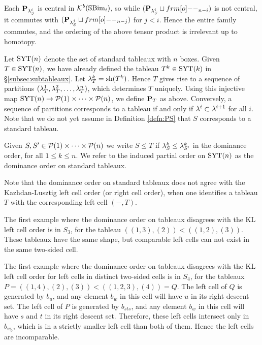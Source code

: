 Each ${\mathbf P}_{\lambda_S^i}$ is central in ${\mathcal{K}}^b({\mathbb{S}}{\rm Bim }_i)$, so while $(\PB_{\l_S^i}\sqcup \one_{n-i})$ is not central, it commutes with $(\PB_{\l_S^j}\sqcup \one_{n-j})$ for $j<i$. Hence the entire family commutes, and the ordering of the above tensor product is irrelevant up to homotopy.

Let $\operatorname{SYT}(n)$ denote the set of standard tableaux with $n$ boxes. Given $T \in \operatorname{SYT}(n)$, we have already defined the tableau $T^k \in \operatorname{SYT}(k)$ in
\S\ref{subsec:subtableaux}. Let $\lambda_T^k = \operatorname{sh}(T^k)$. Hence $T$ gives rise to a sequence of partitions $(\lambda_T^1, \lambda_T^2, \ldots, \lambda_T^n)$, which determines $T$ uniquely. Using this
injective map $\operatorname{SYT}(n) \rightarrow {\mathcal{P}}(1) \times \cdots \times {\mathcal{P}}(n)$, we define ${\mathbf P}_T$ as above. Conversely, a sequence of partitions corresponds to a tableau if and only if $\lambda^i \subset
\lambda^{i+1}$ for all $i$. Note that we do not yet assume in Definition \ref{defn:PS} that $S$ corresponds to a standard tableau.

\begin{definition}
Given $S,S'\in {\mathcal{P}}(1)\times \cdots \times {\mathcal{P}}(n)$ we write $S\leq T$ if $\lambda_S^k\leq \lambda_{S'}^k$ in the dominance order, for all $1\leq k\leq n$.  We refer to the induced partial order on $\operatorname{SYT}(n)$ as the dominance order on standard tableaux.
\end{definition}

Note that the dominance order on standard tableaux does not agree with the Kazhdan-Lusztig left cell order (or right cell order), when one identifies a tableau $T$ with the corresponding
left cell $(-,T)$.

\begin{example} The first example where the dominance order on tableaux disagrees with the KL left cell order is in $S_3$, for the tableau $ ((1,3),(2)) < ((1,2),(3)) $. These tableaux have the same shape, but comparable left cells can not exist in the same two-sided cell. \end{example}

\begin{example} The first example where the dominance order on tableaux disagrees with the KL left cell order for left cells in distinct two-sided cells is in $S_4$, for the tableaux $P
= ((1,4),(2),(3)) < ((1,2,3),(4)) = Q$. The left cell of $Q$ is generated by $b_u$, and any element $b_w$ in this cell will have $u$ in its right descent set. The left cell of $P$ is
generated by $b_{sts}$, and any element $b_w$ in this cell will have $s$ and $t$ in its right descent set. Therefore, these left cells intersect only in $b_{w_0}$, which is in a strictly
smaller left cell than both of them. Hence the left cells are incomparable. \end{example}



